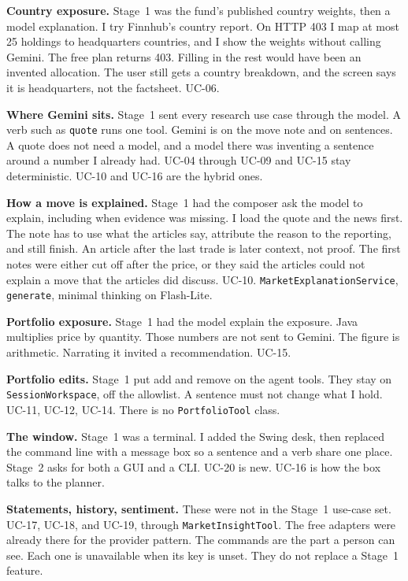 \documentclass[11pt]{article}
\begin{document}
\textbf{Country exposure.}
Stage~1 was the fund's published country weights, then a model explanation.
I try Finnhub's country report. On HTTP 403 I map at most 25 holdings to headquarters countries, and I show the weights without calling Gemini.
The free plan returns 403. Filling in the rest would have been an invented allocation.
The user still gets a country breakdown, and the screen says it is headquarters, not the factsheet. UC-06.

\textbf{Where Gemini sits.}
Stage~1 sent every research use case through the model.
A verb such as \texttt{quote} runs one tool. Gemini is on the move note and on sentences.
A quote does not need a model, and a model there was inventing a sentence around a number I already had.
UC-04 through UC-09 and UC-15 stay deterministic. UC-10 and UC-16 are the hybrid ones.

\textbf{How a move is explained.}
Stage~1 had the composer ask the model to explain, including when evidence was missing.
I load the quote and the news first. The note has to use what the articles say, attribute the reason to the reporting, and still finish. An article after the last trade is later context, not proof.
The first notes were either cut off after the price, or they said the articles could not explain a move that the articles did discuss.
UC-10. \texttt{MarketExplanationService}, \texttt{generate}, minimal thinking on Flash-Lite.

\textbf{Portfolio exposure.}
Stage~1 had the model explain the exposure.
Java multiplies price by quantity. Those numbers are not sent to Gemini.
The figure is arithmetic. Narrating it invited a recommendation.
UC-15.

\textbf{Portfolio edits.}
Stage~1 put add and remove on the agent tools.
They stay on \texttt{SessionWorkspace}, off the allowlist.
A sentence must not change what I hold.
UC-11, UC-12, UC-14. There is no \texttt{PortfolioTool} class.

\textbf{The window.}
Stage~1 was a terminal.
I added the Swing desk, then replaced the command line with a message box so a sentence and a verb share one place.
Stage~2 asks for both a GUI and a CLI.
UC-20 is new. UC-16 is how the box talks to the planner.

\textbf{Statements, history, sentiment.}
These were not in the Stage~1 use-case set.
UC-17, UC-18, and UC-19, through \texttt{MarketInsightTool}.
The free adapters were already there for the provider pattern. The commands are the part a person can see.
Each one is unavailable when its key is unset. They do not replace a Stage~1 feature.
\end{document}
